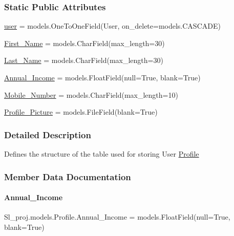 \subsubsection*{Static Public Attributes}
\begin{DoxyCompactItemize}
\item 
\hyperlink{classSl__proj_1_1models_1_1Profile_aa35e001234f34df351ef5d09d32d10dc}{user} = models.\+One\+To\+One\+Field(User, on\+\_\+delete=models.\+C\+A\+S\+C\+A\+DE)
\item 
\hyperlink{classSl__proj_1_1models_1_1Profile_a1a327cdcbea5f5a99956f1f1e6be277b}{First\+\_\+\+Name} = models.\+Char\+Field(max\+\_\+length=30)
\item 
\hyperlink{classSl__proj_1_1models_1_1Profile_a65f3bbb83a59085a39797e504008391b}{Last\+\_\+\+Name} = models.\+Char\+Field(max\+\_\+length=30)
\item 
\hyperlink{classSl__proj_1_1models_1_1Profile_a3469c70f56e7121b54a24e96996d6703}{Annual\+\_\+\+Income} = models.\+Float\+Field(null=True, blank=True)
\item 
\hyperlink{classSl__proj_1_1models_1_1Profile_a777fd69a6df7127a656aec11c943ad57}{Mobile\+\_\+\+Number} = models.\+Char\+Field(max\+\_\+length=10)
\item 
\hyperlink{classSl__proj_1_1models_1_1Profile_adc8136fdb3420ac235d412149b43cca3}{Profile\+\_\+\+Picture} = models.\+File\+Field(blank=True)
\end{DoxyCompactItemize}


\subsubsection{Detailed Description}
Defines the structure of the table used for storing User \hyperlink{classSl__proj_1_1models_1_1Profile}{Profile} 

\subsubsection{Member Data Documentation}
\mbox{\label{classSl__proj_1_1models_1_1Profile_a3469c70f56e7121b54a24e96996d6703}} 
\paragraph{\texorpdfstring{Annual\+\_\+\+Income}{Annual\_Income}}
{\footnotesize\ttfamily Sl\+\_\+proj.\+models.\+Profile.\+Annual\+\_\+\+Income = models.\+Float\+Field(null=True, blank=True)\hspace{0.3cm}{\ttfamily [static]}}

